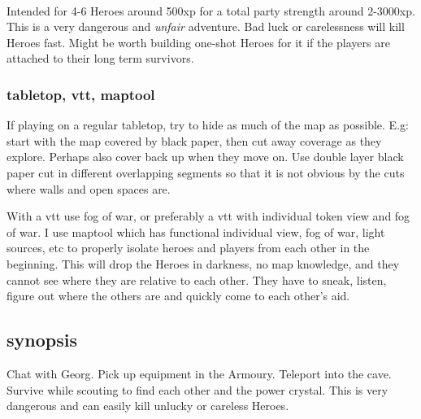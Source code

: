 \

Intended for 4-6 Heroes around 500xp for a total party strength around 2-3000xp. This is a very dangerous and \emph{unfair} adventure. Bad luck or carelessness will kill Heroes fast. Might be worth building one-shot Heroes for it if the players are attached to their long term survivors.




\vspace{1.0\baselineskip}
\tableofcontents
{}
\vspace{2.0\baselineskip}




\subsubsection*{tabletop, vtt, maptool}
If playing on a regular tabletop, try to hide as much of the map as possible. E.g: start with the map covered by black paper, then cut away coverage as they explore. Perhaps also cover back up when they move on. Use double layer black paper cut in different overlapping segments so that it is not obvious by the cuts where walls and open spaces are.

With a vtt use fog of war, or preferably a vtt with individual token view and fog of war. I use maptool which has functional individual view, fog of war, light sources, etc to properly isolate heroes and players from each other in the beginning. This will drop the Heroes in darkness, no map knowledge, and they cannot see where they are relative to each other. They have to sneak, listen, figure out where the others are and quickly come to each other's aid.








\clearpage
\subsection*{synopsis}
Chat with Georg. Pick up equipment in the Armoury. Teleport into the cave. Survive while scouting to find each other and the power crystal. This is very dangerous and can easily kill unlucky or careless Heroes.

